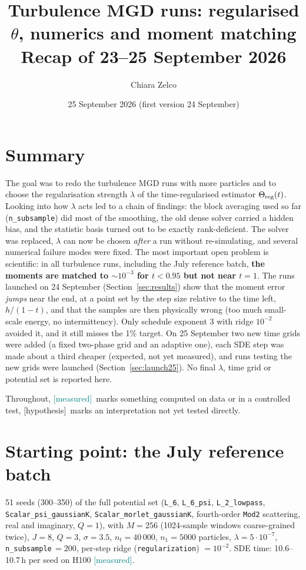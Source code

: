 \documentclass[11pt,a4paper]{article}
\title{Turbulence MGD runs: regularised $\theta$, numerics and moment matching\\[2pt]
\large Recap of 23--25 September 2026}
\author{Chiara Zelco}
\date{25 September 2026 (first version 24 September)}
\newcommand{\code}[1]{\texttt{#1}}
\newcommand{\meas}{\textcolor{teal}{\textsf{[measured]}}}
\newcommand{\hyp}{\textcolor{orange!80!black}{\textsf{[hypothesis]}}}
\begin{document}
\maketitle

\section*{Summary}
The goal was to redo the turbulence MGD runs with more particles and to choose the
regularisation strength $\lambda$ of the time-regularised estimator $\Theta_{\rm reg}(t)$.
Looking into how $\lambda$ acts led to a chain of findings: the block averaging used so far
(\code{n\_subsample}) did most of the smoothing, the old dense solver carried a hidden bias,
and the statistic basis turned out to be exactly rank-deficient. The solver was replaced, $\lambda$ can
now be chosen \emph{after} a run without re-simulating, and several numerical failure modes
were fixed. The most important open problem is scientific: in all turbulence runs, including
the July reference batch, \textbf{the moments are matched to $\sim10^{-3}$ for $t<0.95$ but
not near $t=1$}. The runs launched on 24 September (Section~\ref{sec:results}) show that the
moment error \emph{jumps} near the end, at a point set by the step size relative to the time
left, $h/(1-t)$, and that the samples are then physically wrong (too much small-scale energy,
no intermittency). Only schedule exponent 3 with ridge $10^{-2}$ avoided it, and it still misses
the 1\% target. On 25 September two new time grids were added (a fixed two-phase grid and an
adaptive one), each SDE step was made about a third cheaper (expected, not yet measured), and runs
testing the new grids were launched (Section~\ref{sec:launch25}).
No final $\lambda$, time grid or potential set is reported here.

Throughout, \meas\ marks something computed on data or in a controlled test, \hyp\ marks
an interpretation not yet tested directly.

\section{Starting point: the July reference batch}
51 seeds (300--350) of the full potential set (\code{L\_6}, \code{L\_6\_psi},
\code{L\_2\_lowpass}, \code{Scalar\_psi\_gaussianK}, \code{Scalar\_morlet\_gaussianK},
fourth-order \code{Mod2} scattering, real and imaginary, $Q=1$), with $M=256$ (1024-sample
windows coarse-grained twice), $J=8$, $Q=3$, $\sigma=3.5$, $n_t=40\,000$, $n_1=5000$
particles, $\lambda=5\cdot10^{-7}$, \code{n\_subsample}$\,=200$, per-step ridge
(\code{regularization}) $=10^{-2}$. SDE time: 10.6--10.7\,h per seed on H100 \meas.
\end{document}
